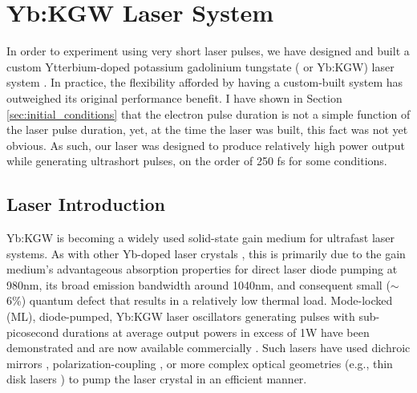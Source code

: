 
\section{Yb:KGW Laser System} \label{sec:laser}


In order to experiment using very short laser pulses, we have designed and built a custom Ytterbium-doped potassium gadolinium tungstate ( or Yb:KGW) laser system \cite{berger_high-power_2008}.
In practice, the flexibility afforded by having a custom-built system has outweighed its original performance benefit.
I have shown in Section \ref{sec:initial_conditions} that the electron pulse duration is not a simple function of the laser pulse duration, yet, at the time the laser was built, this fact was not yet obvious.
As such, our laser was designed to produce relatively high power output while generating ultrashort pulses, on the order of 250 fs for some conditions.

\subsection{Laser Introduction}
Yb:KGW is becoming a widely used solid-state gain medium for ultrafast laser systems.
As with other Yb-doped laser crystals \cite{Brenier_new_criteria}, this is primarily due to the gain medium's advantageous absorption properties for direct laser diode pumping at 980nm, its broad emission bandwidth around 1040nm, and consequent small ($\sim$ 6\%) quantum defect that results in a relatively low thermal load. 
Mode-locked (ML), diode-pumped, Yb:KGW laser oscillators generating pulses with sub-picosecond durations at average output powers in excess of 1W have been demonstrated \cite{Brunner_diode_pumped,Courjaud_high_power,Major_femtosecond_2006,Holtom_mode_locked_2006} and are now available commercially \cite{website_amplitude,website_solar}.
Such lasers have used dichroic mirrors \cite{Brunner_diode_pumped,Major_femtosecond_2006,Paunescu_diode_2004,Major_extended_2006}, polarization-coupling \cite{Holtom_mode_locked_2006}, or more complex optical geometries (e.g., thin disk lasers \cite{website_amplitude,Brunner_pulses_2002}) to pump the laser crystal in an efficient manner.

